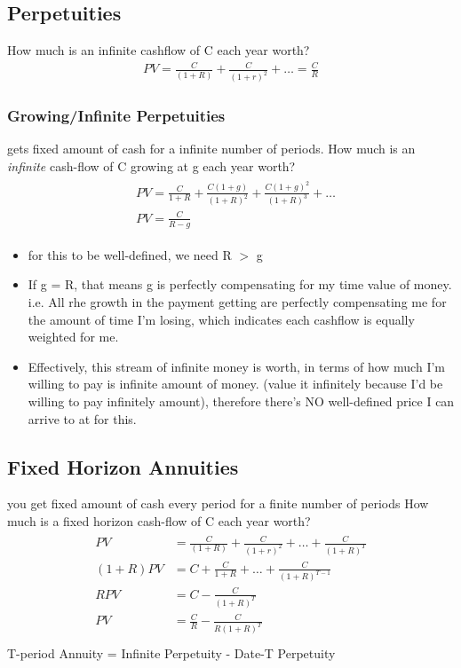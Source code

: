 \begin{multicols}{2}
\subsection{Perpetuities}
How much is an infinite cashflow of C each year worth?
\begin{gather*}
    PV = \frac{C}{(1+R)}+\frac{C}{(1+r)^2}+\dots = \frac{C}{R}
\end{gather*}
\subsubsection{Growing/Infinite Perpetuities}
gets fixed amount of cash for a infinite number of periods. How much is an \textit{infinite} cash-flow of C growing at g each year worth?
\begin{gather*}
    \begin{split}
        &PV = \frac{C}{1+R}+\frac{C(1+g)}{(1+R)^2}+\frac{C(1+g)^2}{(1+R)^3}+\dots\\
        &PV = \frac{C}{R-g}
    \end{split}
\end{gather*}
\begin{itemize}
    \item for this to be well-defined, we need R $>$ g
    \item If g = R, that means g is perfectly compensating for my time value of money. i.e. All rhe growth in the payment getting are perfectly compensating me for the amount of time I'm losing, which indicates each cashflow is equally weighted for me.
    \item Effectively, this stream of infinite money is worth, in terms of how much I'm willing to pay is infinite amount of money. (value it infinitely because I'd be willing to pay infinitely amount), therefore there's NO well-defined price I can arrive to at for this.
\end{itemize}

\subsection{Fixed Horizon Annuities}
you get fixed amount of cash every period for a finite number of periods
How much is a fixed horizon cash-flow of C each year worth?
\begin{gather*}
    \begin{split}
        PV &= \frac{C}{(1+R)}+\frac{C}{(1+r)^2}+\dots+\frac{C}{(1+R)^T}\\
        (1+R)PV &= C + \frac{C}{1+R} + \dots + \frac{C}{(1+R)^{T-1}}\\
        RPV &= C - \frac{C}{(1+R)^T}\\
        PV &= \frac{C}{R} - \frac{C}{R(1+R)^T}\\
    \end{split}
\end{gather*}
T-period Annuity = Infinite Perpetuity - Date-T Perpetuity



\end{multicols}